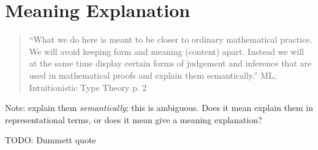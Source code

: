 \documentclass{article}
\begin{document}
\section{Meaning Explanation}

\begin{quote}
``What we do here is meant to be closer to ordinary mathematical practice. We will avoid keeping form and meaning (content) apart. Instead we will at the same time display certain forms of judgement and inference that are used in mathematical proofs and explain them semantically.'' ML, Intuitionistic Type Theory p. 2
\end{quote}

Note: explain them \emph{semantically}; this is ambiguous.  Does it
mean explain them in representational terms, or does it mean give a
meaning explanation?

TODO:  Dummett quote
\end{document}
